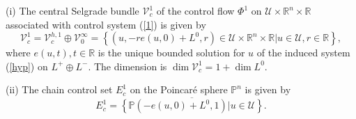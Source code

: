 \documentclass{siamltex}%
\begin{document}
\begin{theorem}
\label{Theorem_central}(i) The central Selgrade bundle $\mathcal{V}_{c}^{1}$
of the control flow $\Phi^{1}$ on $\mathcal{U}\times\mathbb{R}^{n}%
\times\mathbb{R}$ associated with control system (\ref{1}) is given by%
\begin{equation}
\mathcal{V}_{c}^{1}=\mathcal{V}_{c}^{h,1}\oplus\mathcal{V}_{0}^{\infty
}=\left\{  (u,-re(u,0)+L^{0},r)\in\mathcal{U}\times\mathbb{R}^{n}%
\times\mathbb{R}\left\vert u\in\mathcal{U},r\in\mathbb{R}\right.  \right\}  ,
\label{V_c}%
\end{equation}
where $e(u,t),t\in\mathbb{R}$ is the unique bounded solution for $u$ of the
induced system (\ref{hyp}) on $L^{+}\oplus L^{-}$. The dimension is
$\dim\mathcal{V}_{c}^{1}=1+\dim L^{0}$.

(ii) The chain control set $E_{c}^{1}$ on the Poincar\'{e} sphere
$\mathbb{P}^{n}$ is given by%
\[
E_{c}^{1}=\overline{\left\{  \mathbb{P}\left(  -e(u,0)+L^{0},1\right)
\left\vert u\in\mathcal{U}\right.  \right\}  }.
\]

\end{theorem}
\end{document}

